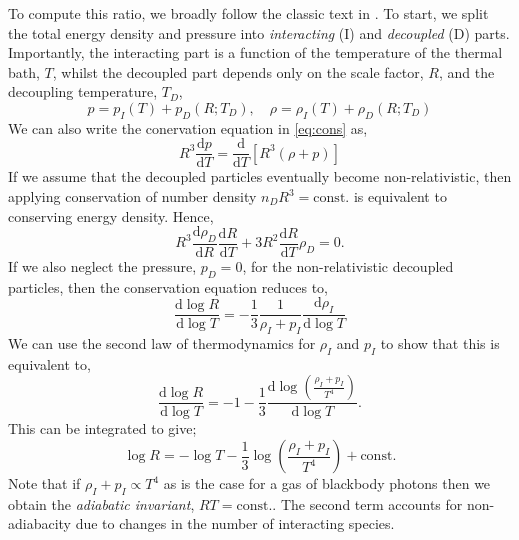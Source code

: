 \documentclass[11pt]{article}
\numberwithin{equation}{section}
\numberwithin{figure}{section}
\numberwithin{table}{section}
\begin{document}
To compute this ratio, we broadly follow the classic text in \citet{Alpher:1953zz}. To start, we split the total energy density and pressure into \textit{interacting} (I) and \textit{decoupled} (D) parts. Importantly, the interacting part is a function of the temperature of the thermal bath, $T$, whilst the decoupled part depends only on the scale factor, $R$, and the decoupling temperature, $T_D$,
\begin{equation}
p = p_I(T) + p_D(R; T_D), \quad \rho = \rho_I(T) + \rho_D(R; T_D)
\end{equation}
We can also write the conervation equation in \eqref{eq:cons} as,
\begin{equation}
R^3 \frac{\mathrm{d}p}{\mathrm{d}T} = \frac{\mathrm{d}}{\mathrm{d}T}\left[R^3 (\rho + p)\right]
\end{equation}
If we assume that the decoupled particles eventually become non-relativistic, then applying conservation of number density $n_D R^3 = \mathrm{const.}$ is equivalent to conserving energy density. Hence,
\begin{equation}
R^3\frac{\mathrm{d}\rho_D}{\mathrm{d}R} \frac{\mathrm{d}R}{\mathrm{d}T} + 3R^2 \frac{\mathrm{d}R}{\mathrm{d}T}\rho_D = 0.
\end{equation}
If we also neglect the pressure, $p_D = 0$, for the non-relativistic decoupled particles, then the conservation equation reduces to,
\begin{equation}
\frac{\mathrm{d}\log R}{\mathrm{d}\log T} = -\frac{1}{3}\frac{1}{\rho_I + p_I}\frac{\mathrm{d}\rho_I}{\mathrm{d}\log T}
\end{equation}
We can use the second law of thermodynamics for $\rho_I$ and $p_I$ to show that this is equivalent to,
\begin{equation}
\frac{\mathrm{d}\log R}{\mathrm{d}\log T} = -1 - \frac{1}{3}\frac{\mathrm{d}\log\left(\frac{\rho_I + p_I}{T^4}\right)}{\mathrm{d}\log T}. \label{eq:specifcentropy}
\end{equation}
This can be integrated to give;
\begin{equation}
\log R = - \log T - \frac{1}{3}\log \left(\frac{\rho_I + p_I}{T^4}\right) + \mathrm{const.}
\end{equation}
Note that if $\rho_I + p_I \propto T^4$ as is the case for a gas of blackbody photons then we obtain the \textit{adiabatic invariant}, $RT = \mathrm{const.}$. The second term accounts for non-adiabacity due to changes in the number of interacting species.
\end{document}
